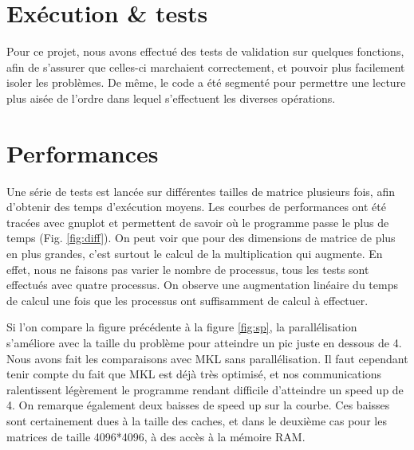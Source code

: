 \section{Exécution \& tests} %
\label{sec:execution}

Pour ce projet, nous avons effectué des tests de validation sur quelques fonctions, afin de s'assurer que celles-ci marchaient correctement, et pouvoir plus facilement isoler les problèmes. 
De même, le code a été segmenté pour permettre une lecture plus aisée de l'ordre dans lequel s'effectuent les diverses opérations.

\section{Performances} %
\label{sec:perf}

Une série de tests est lancée sur différentes tailles de matrice plusieurs fois, afin d'obtenir des temps d'exécution moyens.
Les courbes de performances ont été tracées avec gnuplot et permettent de savoir où le programme passe le plus de temps (Fig. \ref{fig:diff}). On peut voir que pour des dimensions de matrice de plus en plus grandes, c'est surtout le calcul de la multiplication qui augmente. En effet, nous ne faisons pas varier le nombre de processus, tous les tests sont effectués avec quatre processus. On observe une augmentation linéaire du temps de calcul une fois que les processus ont suffisamment de calcul à effectuer.


Si l'on compare la figure précédente à la figure \ref{fig:sp}, la parallélisation s'améliore avec la taille du problème pour atteindre un pic juste en dessous de 4. Nous avons fait les comparaisons avec MKL sans parallélisation. Il faut cependant tenir compte du fait que MKL est déjà très optimisé, et nos communications ralentissent légèrement le programme rendant difficile d'atteindre un speed up de 4. On remarque également deux baisses de speed up sur la courbe. Ces baisses sont certainement dues à la taille des caches, et dans le deuxième cas pour les matrices de taille 4096*4096, à des accès à la mémoire RAM.


